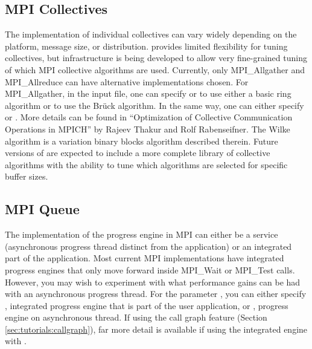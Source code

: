 \subsection{MPI Collectives}
The implementation of individual collectives can vary widely depending on the platform, message size, or distribution.
\sstmacro provides limited flexibility for tuning collectives, but infrastructure is being developed to allow very fine-grained tuning
of which MPI collective algorithms are used.  Currently, only MPI\_Allgather and MPI\_Allreduce can have alternative implementations chosen.
For MPI\_Allgather, in the input file, one can specify  or 
to use either a basic ring algorithm or to use the Br{\"u}ck algorithm.  In the same way, one can either specify
 or .
More details can be found in ``Optimization of Collective Communication Operations in MPICH'' by Rajeev Thakur and Rolf Rabenseifner.
The Wilke algorithm is a variation binary blocks algorithm described therein.
Future versions of \sstmacro are expected to include a more complete library of collective algorithms with the ability to tune which algorithms are selected for specific buffer sizes.

\subsection{MPI Queue}
The implementation of the progress engine in MPI can either be a service (asynchronous progress thread distinct from the application) or an integrated part of the application.
Most current MPI implementations have integrated progress engines that only move forward inside MPI\_Wait or MPI\_Test calls.
However, you may wish to experiment with what performance gains can be had with an asynchronous progress thread.
For the parameter , you can either specify , integrated progress engine that is part of the user application,
or , progress engine on asynchronous thread.
If using the call graph feature (Section \ref{sec:tutorials:callgraph}), far more detail is available if using the integrated engine with .